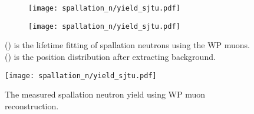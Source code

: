\begin{figure}[htbp]
	\centering
	\begin{subfigure}{0.5\textwidth}
		\centering
		\texttt{[image: spallation\_n/yield\_sjtu.pdf]}
		\caption{}
		\label{fig:yield_sjtu8}
	\end{subfigure}%
	\begin{subfigure}{0.5\textwidth}
		\centering
		\texttt{[image: spallation\_n/yield\_sjtu.pdf]}
		\caption{}
		\label{fig:yield_sjtu11}
	\end{subfigure}
	\caption{() is the lifetime fitting of spallation neutrons using the WP muons. () is the position distribution after extracting background.}
	\label{fig:yield_sjtu_yield}
\end{figure}


\begin{figure}[htbp]
	\centering
	\texttt{[image: spallation\_n/yield\_sjtu.pdf]}
	\caption{The measured spallation neutron yield using WP muon reconstruction.}
	\label{fig:yield_sjtu22}
\end{figure}
